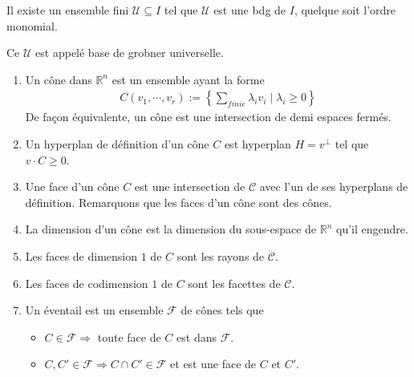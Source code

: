         \begin{coro}
            Il existe un ensemble fini $\mathcal{U} \subseteq I$ tel que $\mathcal{U}$ est une bdg de $I$, quelque soit l'ordre monomial.
        \end{coro}
        \begin{defi}
            Ce $\mathcal{U}$ est appelé base de grobner universelle.
        \end{defi}

        \begin{defi}
            \begin{enumerate}
                \item Un cône dans $\mathbb{R}^n$ est un ensemble ayant la forme
                \begin{align*}
                    C(v_1, \cdots, v_r) := \left\{ \sum_{finie} \lambda_i v_i \mid \lambda_i \geq 0 \right\}
                \end{align*}
                De façon équivalente, un cône est une intersection de demi espaces fermés.
                \item Un hyperplan de définition d'un cône $C$ est hyperplan $H = v^\bot$ tel que $v \cdot C \geq 0$.
                \item Une face d'un cône $C$ est une intersection de $\mathcal{C}$ avec l'un de ses hyperplans de définition. Remarquons que les faces d'un cône sont des cônes.
                \item La dimension d'un cône est la dimension du sous-espace de $\mathbb{R}^n$ qu'il engendre.
                \item Les faces de dimension $1$ de $C$ sont les rayons de $\mathcal{C}$.
                \item Les faces de codimension $1$ de $C$ sont les facettes de $\mathcal{C}$.
                \item Un éventail est un ensemble $\mathcal{F}$ de cônes tels que
                \begin{itemize}
                    \item $C \in \mathcal{F} \Rightarrow$ toute face de $C$ est dans $\mathcal{F}$.
                    \item $C,C' \in \mathcal{F} \Rightarrow C \cap C' \in \mathcal{F}$ et est une face de $C$ et $C'$.
                \end{itemize}
            \end{enumerate}
        \end{defi}